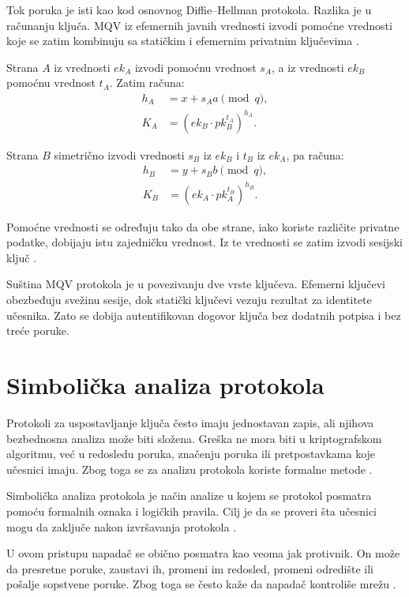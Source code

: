 Tok poruka je isti kao kod osnovnog Diffie--Hellman protokola. Razlika je u računanju ključa. MQV iz efemernih javnih vrednosti izvodi pomoćne vrednosti koje se zatim kombinuju sa statičkim i efemernim privatnim ključevima \cite{smart2016cryptography}.

Strana \(A\) iz vrednosti \(ek_A\) izvodi pomoćnu vrednost \(s_A\), a iz vrednosti \(ek_B\) pomoćnu vrednost \(t_A\). Zatim računa:
\[
\begin{aligned}
h_A &= x + s_A a \pmod q, \\
K_A &= (ek_B \cdot pk_B^{t_A})^{h_A}.
\end{aligned}
\]

Strana \(B\) simetrično izvodi vrednosti \(s_B\) iz \(ek_B\) i \(t_B\) iz \(ek_A\), pa računa:
\[
\begin{aligned}
h_B &= y + s_B b \pmod q, \\
K_B &= (ek_A \cdot pk_A^{t_B})^{h_B}.
\end{aligned}
\]

Pomoćne vrednosti se određuju tako da obe strane, iako koriste različite privatne podatke, dobijaju istu zajedničku vrednost. Iz te vrednosti se zatim izvodi sesijski ključ \cite{smart2016cryptography}.

Suština MQV protokola je u povezivanju dve vrste ključeva. Efemerni ključevi obezbeđuju svežinu sesije, dok statički ključevi vezuju rezultat za identitete učesnika. Zato se dobija autentifikovan dogovor ključa bez dodatnih potpisa i bez treće poruke.

\section{Simbolička analiza protokola}

Protokoli za uspostavljanje ključa često imaju jednostavan zapis, ali njihova bezbednosna analiza može biti složena. Greška ne mora biti u kriptografskom algoritmu, već u redosledu poruka, značenju poruka ili pretpostavkama koje učesnici imaju. Zbog toga se za analizu protokola koriste formalne metode \cite{smart2016cryptography}.

\begin{definition}
Simbolička analiza protokola je način analize u kojem se protokol posmatra pomoću formalnih oznaka i logičkih pravila. Cilj je da se proveri šta učesnici mogu da zaključe nakon izvršavanja protokola \cite{smart2016cryptography}.
\end{definition}

U ovom pristupu napadač se obično posmatra kao veoma jak protivnik. On može da presretne poruke, zaustavi ih, promeni im redosled, promeni odredište ili pošalje sopstvene poruke. Zbog toga se često kaže da napadač kontroliše mrežu \cite{smart2016cryptography}.

